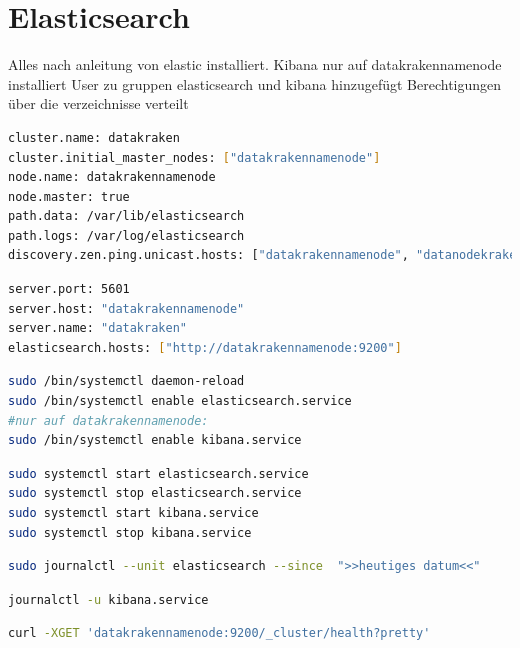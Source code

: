 \documentclass[12pt,twoside,a4paper,parskip]{scrbook}
\begin{document}
\section{Elasticsearch}
Alles nach anleitung von elastic installiert.
Kibana nur auf datakrakennamenode installiert
User zu gruppen elasticsearch und kibana hinzugefügt
Berechtigungen über die verzeichnisse verteilt

\begin{lstlisting}[caption=elasticsearch.yml,label=elasticyml,language=bash]
cluster.name: datakraken
cluster.initial_master_nodes: ["datakrakennamenode"]
node.name: datakrakennamenode
node.master: true
path.data: /var/lib/elasticsearch
path.logs: /var/log/elasticsearch
discovery.zen.ping.unicast.hosts: ["datakrakennamenode", "datanodekraken1", "datanodekraken2"]
\end{lstlisting}

\begin{lstlisting}[caption=kibana.yml,label=kibanayml,language=bash]
server.port: 5601
server.host: "datakrakennamenode"
server.name: "datakraken"
elasticsearch.hosts: ["http://datakrakennamenode:9200"]
\end{lstlisting}


\begin{lstlisting}[caption=Setup zum automatischen Start mit jedem Boot, label=boot,language=bash]
sudo /bin/systemctl daemon-reload
sudo /bin/systemctl enable elasticsearch.service
#nur auf datakrakennamenode:
sudo /bin/systemctl enable kibana.service
\end{lstlisting}
\begin{lstlisting}[caption=Manuelles Starten/ Stoppen von Elasticsearch/Kibana,label=startstopelastic,language=bash]
sudo systemctl start elasticsearch.service
sudo systemctl stop elasticsearch.service
sudo systemctl start kibana.service
sudo systemctl stop kibana.service
\end{lstlisting}


\begin{lstlisting}[caption=Befehl zum durchsuchen der Logdaten,label=logelastic,language=bash]
sudo journalctl --unit elasticsearch --since  ">>heutiges datum<<"
\end{lstlisting}

\begin{lstlisting}[caption=Befehl zum durchsuchen der Logdaten,label=logkibana,language=bash]
journalctl -u kibana.service
\end{lstlisting}

\begin{lstlisting}[caption=Statusabfrage Elasticsearch,label=statuselastic,language=bash]
curl -XGET 'datakrakennamenode:9200/_cluster/health?pretty'
\end{lstlisting}
\end{document}
